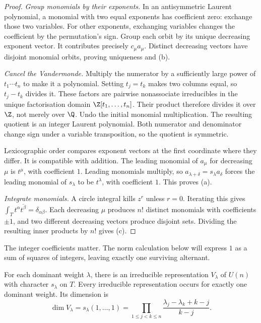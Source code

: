 \begin{proof}
\emph{Group monomials by their exponents.} In an antisymmetric Laurent polynomial, a monomial with two equal exponents has coefficient zero: exchange those two variables. For other exponents, exchanging variables changes the coefficient by the permutation's sign. Group each orbit by its unique decreasing exponent vector. It contributes precisely $c_\mu a_\mu$. Distinct decreasing vectors have disjoint monomial orbits, proving uniqueness and (b).

\emph{Cancel the Vandermonde.} Multiply the numerator by a sufficiently large power of $t_1\cdots t_n$ to make it a polynomial. Setting $t_j=t_k$ makes two columns equal, so $t_j-t_k$ divides it. These factors are pairwise nonassociate irreducibles in the unique factorisation domain $\Z[t_1,\ldots,t_n]$. Their product therefore divides it over $\Z$, not merely over $\Q$. Undo the initial monomial multiplication. The resulting quotient is an integer Laurent polynomial. Both numerator and denominator change sign under a variable transposition, so the quotient is symmetric.

Lexicographic order compares exponent vectors at the first coordinate where they differ. It is compatible with addition. The leading monomial of $a_\mu$ for decreasing $\mu$ is $t^\mu$, with coefficient $1$. Leading monomials multiply, so $a_{\lambda+\delta}=s_\lambda a_\delta$ forces the leading monomial of $s_\lambda$ to be $t^\lambda$, with coefficient $1$. This proves (a).

\emph{Integrate monomials.} A circle integral kills $z^r$ unless $r=0$. Iterating this gives $\int_T t^\alpha\overline{t^\beta}=\delta_{\alpha\beta}$. Each decreasing $\mu$ produces $n!$ distinct monomials with coefficients $\pm1$, and two different decreasing vectors produce disjoint sets. Dividing the resulting inner products by $n!$ gives (c).
\end{proof}

The integer coefficients matter. The norm calculation below will express $1$ as a sum of squares of integers, leaving exactly one surviving alternant.

\begin{theorem}\label{thm:weylchar}
For each dominant weight $\lambda$, there is an irreducible representation $V_\lambda$ of $U(n)$ with character $s_\lambda$ on $T$. Every irreducible representation occurs for exactly one dominant weight. Its dimension is
\[
\dim V_\lambda=s_\lambda(1,\ldots,1)
=\prod_{1\le j<k\le n}
\frac{\lambda_j-\lambda_k+k-j}{k-j}.
\]
\end{theorem}

